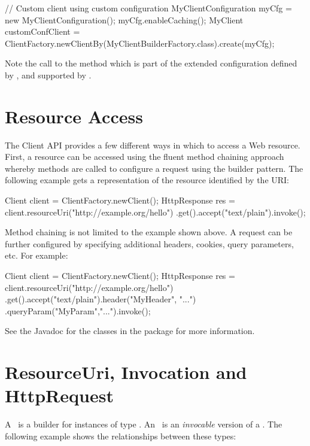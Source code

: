 \begin{listing}{1}
// Custom client using custom configuration
MyClientConfiguration myCfg = new MyClientConfiguration();
myCfg.enableCaching();
MyClient customConfClient = 
    ClientFactory.newClientBy(MyClientBuilderFactory.class).create(myCfg);
\end{listing}

Note the call to the method  which is part of the extended configuration defined by , and supported by .

\section{Resource Access}
\label{resource_access}

The Client API provides a few different ways in which to access a Web resource. First, a resource can be accessed using the fluent method chaining approach whereby methods are called to configure a request using the builder pattern. The following example gets a  representation of the resource identified by the  URI:

\begin{listing}{1}
Client client = ClientFactory.newClient();
HttpResponse res = client.resourceUri("http://example.org/hello")
    .get().accept("text/plain").invoke();
\end{listing}

Method chaining is not limited to the example shown above. A request can be further configured by specifying additional headers, cookies, query parameters, etc. For example:

\begin{listing}{1}
Client client = ClientFactory.newClient();
HttpResponse res = client.resourceUri("http://example.org/hello")
    .get().accept("text/plain").header("MyHeader", "...")
    .queryParam("MyParam","...").invoke();
\end{listing}

See the Javadoc for the classes in the  package for more information.

\section{ResourceUri, Invocation and HttpRequest}

A \ResourceUri\ is a builder for instances of type \Invocation. An \Invocation\ is an \emph{invocable} version of a \HttpRequest. The following example shows the relationships between these types:

